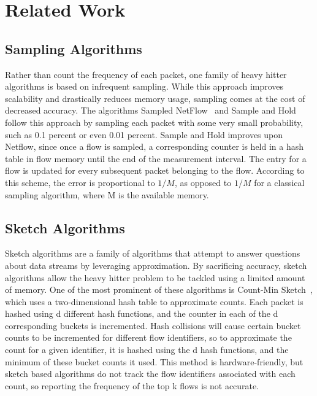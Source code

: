 \section{Related Work}
\label{sec:related}

\subsection{Sampling Algorithms}
Rather than count the frequency of each packet, one family of heavy hitter algorithms is based on infrequent sampling. While this approach improves scalability and drastically reduces memory usage, sampling comes at the cost of decreased accuracy. The algorithms Sampled NetFlow~\cite{netflow} and Sample and Hold~\cite{samplehold} follow this approach by sampling each packet with some very small probability, such as 0.1 percent or even 0.01 percent. Sample and Hold improves upon Netflow, since once a flow is sampled, a corresponding counter is held in a hash table in flow memory until the end of the measurement interval. The entry for a flow is updated for every subsequent packet belonging to the flow. According to this scheme, the error is proportional to $1/M$, as opposed to $1/M$ for a classical sampling algorithm, where M is the available memory. 

\subsection{Sketch Algorithms}
Sketch algorithms are a family of algorithms that attempt to answer questions about data streams by leveraging approximation. By sacrificing accuracy, sketch algorithms allow the heavy hitter problem to be tackled using a limited amount of memory. One of the most prominent of these algorithms is Count-Min Sketch~\cite{countmin}, which uses a two-dimensional hash table to approximate counts. Each packet is hashed using d different hash functions, and the counter in each of the d corresponding buckets is incremented. Hash collisions will cause certain bucket counts to be incremented for different flow identifiers, so to approximate the count for a given identifier, it is hashed using the d hash functions, and the minimum of these bucket counts it used. This method is hardware-friendly, but sketch based algorithms do not track the flow identifiers associated with each count, so reporting the frequency of the top k flows is not accurate.

